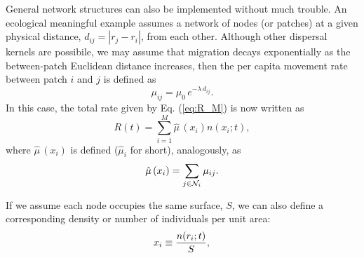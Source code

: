 General network structures can also be implemented without much trouble. An ecological meaningful example assumes a network of nodes (or patches) at a given physical distance, $d_{ij} =|r_j -r_i|$, from each other. Although other dispersal kernels are possibile, we may assume that migration decays exponentially as the between-patch Euclidean distance increases, then the per capita movement rate between patch $i$ and $j$ is defined as
\begin{equation}
\mu_{ij} = \mu_0 \, e^{-\lambda\,d_{ij}}. \nonumber
\end{equation}
In this case, the total rate given by Eq. (\ref{eq:R_M}) is now written as
\begin{equation}
R(t) = \sum_{i=1}^{M} \hat{\mu}\,(x_i) n(x_i;t),
\label{eq:R_MM}
\end{equation}
where $\hat{\mu}\,(x_i)$ is defined ($\hat{\mu}_i$ for short), analogously, as  
\begin{equation}
\hat{\mu}\,(x_i) = \sum_{j \in {\cal N}_i} \mu_{ij}.
\end{equation}   

If we assume each node occupies the same surface, $S$, we can also define a corresponding density or number of individuals per unit area:   
\begin{equation}
x_i \equiv \frac{n(r_i;t)}{S}, \\
\label{eq:x_i}
\end{equation}

